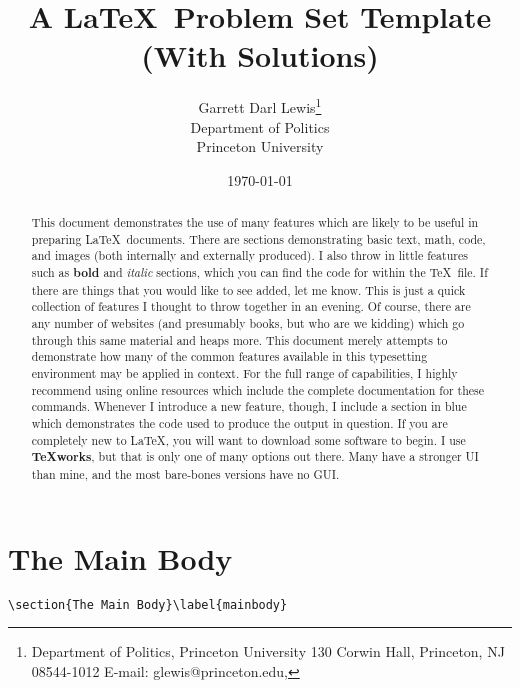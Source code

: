 \documentclass[letter,12pt]{article}
\title{A \LaTeX\ Problem Set Template (With Solutions)}
\author{Garrett Darl Lewis\thanks{Department of Politics, Princeton University  130 Corwin Hall, Princeton, NJ 08544-1012  E-mail: glewis@princeton.edu, }\\ Department of Politics\\ Princeton University}
\date{\today}
\begin{document}
\maketitle
\tableofcontents

\begin{abstract}
This document demonstrates the use of many features which are likely to be useful in preparing \LaTeX\ documents.  There are sections demonstrating basic text, math, code, and images (both internally and externally produced).  I also throw in little features such as \textbf{bold} and \textit{italic} sections, which you can find the code for within the \TeX\ file.  If there are things that you would like to see added, let me know.  This is just a quick collection of features I thought to throw together in an evening.  Of course, there are any number of websites (and presumably books, but who are we kidding) which go through this same material and heaps more.  This document merely attempts to demonstrate how many of the common features available in this typesetting environment may be applied in context.  For the full range of capabilities, I highly recommend using online resources which include the complete documentation for these commands.  Whenever I introduce a new feature, though, I include a section in blue which demonstrates the code used to produce the output in question.  If you are completely new to \LaTeX , you will want to download some software to begin.  I use \textbf{TeXworks}, but that is only one of many options out there.  Many have a stronger UI than mine, and the most bare-bones versions have no GUI.  
\end{abstract}







\section{The Main Body}\label{mainbody}

\begin{lstlisting}
\section{The Main Body}\label{mainbody}
\end{lstlisting}

\end{document}
